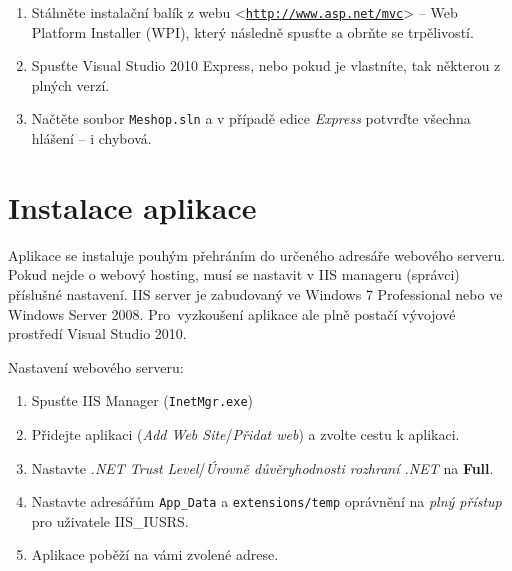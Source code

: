 \documentclass[11pt,twoside,a4paper]{book}
\let\oldUrl\url
\renewcommand\url[1]{<\texttt{\oldUrl{#1}}>}
\begin{document}
\begin{enumerate}
\item Stáhněte instalační balík z webu \url{http://www.asp.net/mvc} -- Web Platform Installer (WPI), který následně spusťte a obrňte se trpělivostí.


\item Spusťte Visual Studio 2010 Express, nebo pokud je vlastníte, tak některou z plných verzí.
\item Načtěte soubor \texttt{Meshop.sln} a v případě edice \textit{Express} potvrďte všechna hlášení -- i chybová.

\end{enumerate}




\section{Instalace aplikace}
Aplikace se instaluje pouhým přehráním do určeného adresáře webového serveru.
Pokud nejde o webový hosting, musí se nastavit v IIS manageru (správci) příslušné nastavení. IIS server je zabudovaný ve Windows 7 Professional nebo ve Windows Server 2008.
Pro~vyzkoušení aplikace ale plně postačí vývojové prostředí Visual Studio 2010.

Nastavení webového serveru:
\begin{enumerate}
\item Spusťte IIS Manager (\texttt{InetMgr.exe})
\item Přidejte aplikaci (\textit{Add Web Site}/\textit{Přidat web}) a zvolte cestu k aplikaci.
\item Nastavte \textit{.NET Trust Level}/\textit{Úrovně důvěryhodnosti rozhraní .NET} na \textbf{Full}.
\item Nastavte adresářům \texttt{App\_Data} a \texttt{extensions/temp} oprávnění na \textit{plný přístup} pro uživatele IIS\_IUSRS.
\item Aplikace poběží na vámi zvolené adrese.
\end{enumerate}
\end{document}

